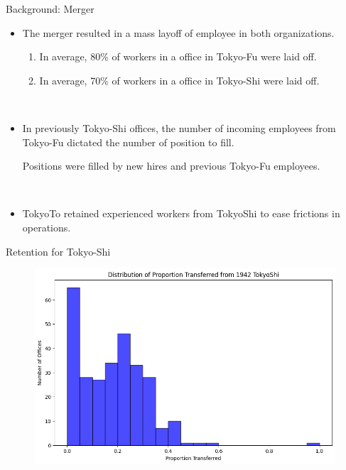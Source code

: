 \begin{frame}{Background: Merger}
    \begin{itemize}
        \item The merger resulted in a mass layoff of employee in both organizations.

        \begin{enumerate}
            \item In average, 80\% of workers in a office in Tokyo-Fu were laid off.
            \item In average, 70\% of workers in a office in Tokyo-Shi were laid off.
        \end{enumerate}

        \

        \item In previously Tokyo-Shi offices, the number of incoming employees from Tokyo-Fu dictated the number of position to fill.

        Positions were filled by new hires and previous Tokyo-Fu employees.

        \

        \item TokyoTo retained experienced workers from TokyoShi to ease frictions in operations.
    \end{itemize}
\end{frame}

\begin{frame}{Retention for Tokyo-Shi}
    \begin{figure}
        \centering
        \includegraphics[width = \textwidth]{Background/TokyoShiTransfer.png}
        \label{fig:enter-label}
    \end{figure}
\end{frame}

